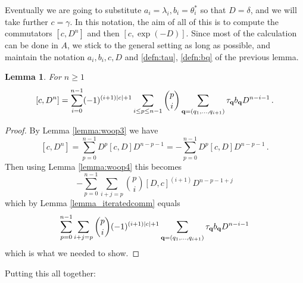 \documentclass[english,letter paper,12pt,leqno]{article}
\newtheorem{lemma}[theorem]{Lemma}
\theoremstyle{example}
\numberwithin{equation}{section}
\def\be{\begin{equation}}
\def\ee{\end{equation}}
\begin{document}
Eventually we are going to substitute $a_i = \lambda_i, b_i = \theta_i^*$ so that $D = \delta$, and we will take further $c = \gamma$. In this notation, the aim of all of this is to compute the commutators $[c, D^n]$ and then $[c, \exp(-D)]$. Since most of the calculation can be done in $A$, we stick to the general setting as long as possible, and maintain the notation $a_i, b_i, c, D$ and \eqref{defn:tau}, \eqref{defn:bq} of the previous lemma.


\begin{lemma}\label{lemma:commutator_wha} For $n \ge 1$
\[
[ c, D^n ] = \sum_{i=0}^{n-1} (-1)^{(i+1)|c| + 1} \sum_{i \le p \le n-1} \binom{p}{i} \sum_{\bold{q} = (q_1,\ldots,q_{i+1})} \tau_{\bold{q}} b_{\bold{q}} D^{n-i-1}\,.
\]
\end{lemma}
\begin{proof} 
By Lemma \ref{lemma:woop3} we have
\begin{equation}\label{eq:catfish}
[ c, D^n ] = \sum_{p=0}^{n-1} D^p [ c, D ] D^{n-p-1} = -\sum_{p=0}^{n-1} D^p [ c, D ] D^{n-p-1}\,.
\end{equation}
Then using Lemma \ref{lemma:woop4} this becomes
\be
-\sum_{p=0}^{n-1} \sum_{i+j=p} \binom{p}{i} [D, c]^{(i+1)} D^{n-p-1+j}
\ee
which by Lemma \ref{lemma_iteratedcomm} equals
\be
\sum_{p=0}^{n-1} \sum_{i+j=p} \binom{p}{i} (-1)^{(i+1)|c| + 1} \sum_{\bold{q} = (q_1,\ldots,q_{i+1})} \tau_{\bold{q}} b_{\bold{q}} D^{n-i-1}
\ee
which is what we needed to show.
\end{proof}

Putting this all together:
\end{document}
